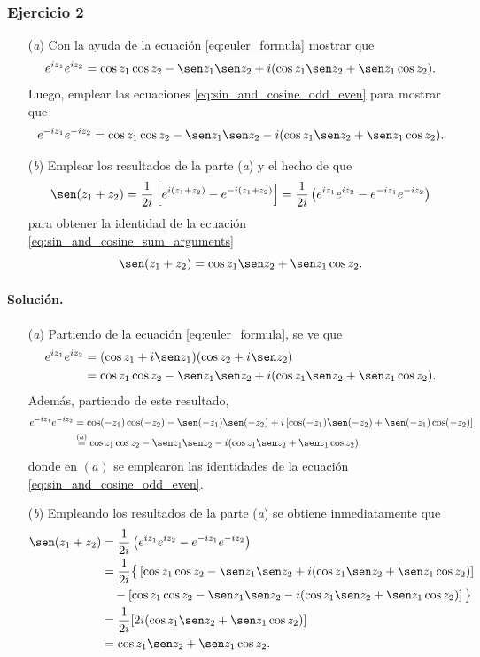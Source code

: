 \documentclass[a4paper]{report}
\begin{document}
\subsubsection{Ejercicio 2}

\begin{enumerate}
 \item[(\textit{a})] Con la ayuda de la ecuación \ref{eq:euler_formula} mostrar que 
 \[
  e^{iz_1}e^{iz_2}=\cos z_1\cos z_2-\sen z_1\sen z_2+i(\cos z_1\sen z_2+\sen z_1\cos z_2).
 \]
 Luego, emplear las ecuaciones \ref{eq:sin_and_cosine_odd_even} para mostrar que 
 \[
  e^{-iz_1}e^{-iz_2}=\cos z_1\cos z_2-\sen z_1\sen z_2-i(\cos z_1\sen z_2+\sen z_1\cos z_2).
 \]
 \item[(\textit{b})] Emplear los resultados de la parte (\textit{a}) y el hecho de que 
 \[
  \sen(z_1+z_2)=\frac{1}{2i}\left[e^{i(z_1+z_2)}-e^{-i(z_1+z_2)}\right]
  =\frac{1}{2i}\left(e^{iz_1}e^{iz_2}-e^{-iz_1}e^{-iz_2}\right)
 \]
 para obtener la identidad de la ecuación \ref{eq:sin_and_cosine_sum_arguments}
 \[
  \sen(z_1+z_2)=\cos z_1\sen z_2+\sen z_1\cos z_2.
 \]
\end{enumerate}

\paragraph{Solución.} 

\begin{enumerate}
 \item[(\textit{a})] Partiendo de la ecuación \ref{eq:euler_formula}, se ve que 
 \begin{align*}
  e^{iz_1}e^{iz_2}&=(\cos z_1+i\sen z_1)(\cos z_2+i\sen z_2)\\
   &=\cos z_1\cos z_2-\sen z_1\sen z_2+i(\cos z_1\sen z_2+\sen z_1\cos z_2).
 \end{align*}
 Además, partiendo de este resultado,
 \begin{align*}
  e^{-iz_1}e^{-iz_2}&=\cos(-z_1)\cos(-z_2)-\sen(-z_1)\sen(-z_2)+i\left[\cos(-z_1)\sen(-z_2)+\sen(-z_1)\cos(-z_2)\right]\\
   &\overset{(a)}{=}\cos z_1\cos z_2-\sen z_1\sen z_2-i(\cos z_1\sen z_2+\sen z_1\cos z_2),
 \end{align*}
 donde en \((a)\) se emplearon las identidades de la ecuación \ref{eq:sin_and_cosine_odd_even}.
 \item[(\textit{b})] Empleando los resultados de la parte (\textit{a}) se obtiene inmediatamente que 
 \begin{align*}
   \sen(z_1+z_2)&=\frac{1}{2i}\left(e^{iz_1}e^{iz_2}-e^{-iz_1}e^{-iz_2}\right)\\
     &=\frac{1}{2i}\big\{\left[\cos z_1\cos z_2-\sen z_1\sen z_2+i(\cos z_1\sen z_2+\sen z_1\cos z_2)\right]\\
     &\quad-\left[\cos z_1\cos z_2-\sen z_1\sen z_2-i(\cos z_1\sen z_2+\sen z_1\cos z_2)\right]\big\}\\
     &=\frac{1}{2i}[2i(\cos z_1\sen z_2+\sen z_1\cos z_2)]\\
     &=\cos z_1\sen z_2+\sen z_1\cos z_2.
 \end{align*}
\end{enumerate} 
\end{document}
